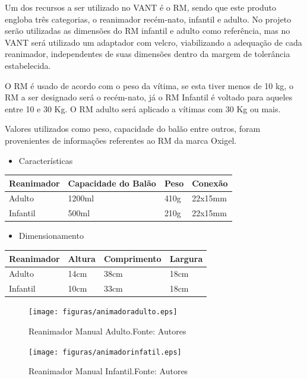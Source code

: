 Um dos recursos a ser utilizado no VANT é o RM, sendo que este produto engloba três categorias, o reanimador recém-nato, infantil e adulto. No projeto serão utilizadas as dimensões do RM infantil e adulto como referência, mas no VANT será utilizado um adaptador com velcro, viabilizando a adequação de cada reanimador, independentes de suas dimensões dentro da margem de tolerância estabelecida.

O RM é usado de acordo com o peso da vítima, se esta tiver menos de 10 kg, o RM a ser designado será o recém-nato, já o RM Infantil é voltado para aqueles entre 10 e 30 Kg. O RM adulto será aplicado a vítimas com 30 Kg ou mais.

Valores utilizados como peso, capacidade do balão entre outros, foram provenientes de informações referentes ao RM da marca Oxigel.

\begin{itemize}
	\item Características
\end{itemize}

\begin{table}[H]
\begin{tabular}{|l|l|l|l|}
\hline
\multicolumn{1}{|c|}{Reanimador} & Capacidade do Balão & Peso & Conexão \\ \hline
Adulto                           & 1200ml              & 410g & 22x15mm \\ \hline
Infantil                         & 500ml               & 210g & 22x15mm \\ \hline
\end{tabular}
\end{table}


\begin{itemize}
	\item Dimensionamento
\end{itemize}

\begin{table}[H]
\begin{tabular}{|l|l|l|l|}
\hline
\multicolumn{1}{|c|}{Reanimador} & Altura & Comprimento & Largura \\ \hline
Adulto                           & 14cm   & 38cm        & 18cm    \\ \hline
Infantil                         & 10cm   & 33cm        & 18cm    \\ \hline
\end{tabular}
\end{table}


\vfill
\begin{figure}[H]
	\centering
	  \texttt{[image: figuras/animadoradulto.eps]}
	\caption{Reanimador Manual Adulto.Fonte: Autores}
	\label{fig:animadoradulto}
\end{figure}

\begin{figure}[H]
	\centering
	  \texttt{[image: figuras/animadorinfatil.eps]}
	\caption{ Reanimador Manual Infantil.Fonte: Autores}
	\label{fig:animadorinfatil}
\end{figure}

